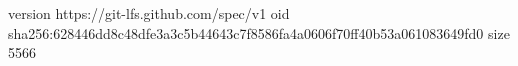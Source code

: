 version https://git-lfs.github.com/spec/v1
oid sha256:628446dd8c48dfe3a3c5b44643c7f8586fa4a0606f70ff40b53a061083649fd0
size 5566
